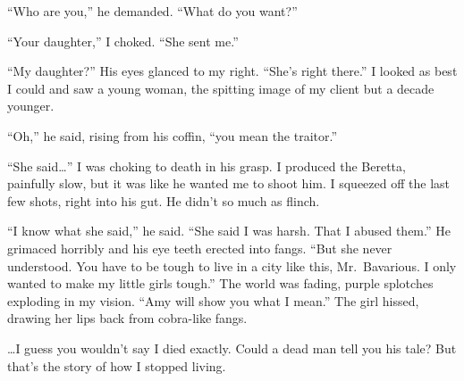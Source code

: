 ``Who are you,'' he demanded. ``What do you
want?''



``Your daughter,'' I choked. ``She sent
me.''



``My daughter?'' His eyes glanced to my right.
``She's right there.'' I looked as best I could and
saw a young woman, the spitting image of my client but a decade
younger.



``Oh,'' he said, rising from his coffin, ``you mean
the traitor.''



``She said{\ldots}'' I was choking to death in his grasp.
I produced the Beretta, painfully slow, but it was like he wanted
me to shoot him. I squeezed off the last few shots, right into his
gut. He didn't so much as flinch.



``I know what she said,'' he said. ``She said I was
harsh. That I abused them.'' He grimaced horribly and his eye
teeth erected into fangs. ``But she never understood. You have
to be tough to live in a city like this, Mr.\ Bavarious. I only
wanted to make my little girls tough.'' The world was fading,
purple splotches exploding in my vision. ``Amy will show you
what I mean.'' The girl hissed, drawing her lips back from
cobra-like fangs.



{\ldots}I guess you wouldn't say I died exactly. Could a dead
man tell you his tale? But that's the story of how I stopped
living. 
 




